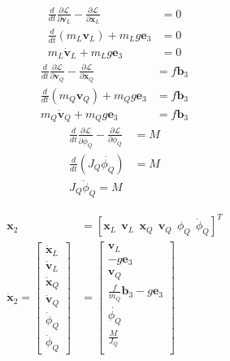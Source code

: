 \documentclass[11pt]{article}
\begin{document}
\begin{align*}
\frac{d}{dt} \frac{\partial \mathcal{L}}{\partial \mathbf{v}_L} - \frac{\partial \mathcal{L}}{\partial \mathbf{x}_L} &= 0 \\
\frac{d}{dt} \left( m_L \mathbf{v}_L \right) + m_L g \mathbf{e}_3 &= 0 \\
m_L \mathbf{\dot{v}}_L + m_L g \mathbf{e}_3 &= 0
\end{align*}
\begin{align*}
\frac{d}{dt} \frac{\partial \mathcal{L}}{\partial \mathbf{v}_Q} - \frac{\partial \mathcal{L}}{\partial \mathbf{x}_Q} &= f \mathbf{b}_3 \\
\frac{d}{dt} \left( m_Q \mathbf{v}_Q \right) + m_Q g \mathbf{e}_3 &= f \mathbf{b}_3 \\
m_Q \mathbf{\dot{v}}_Q + m_Q g \mathbf{e}_3 &= f \mathbf{b}_3
\end{align*}
\begin{align*}
\frac{d}{dt} \frac{\partial \mathcal{L}}{\partial \dot{\phi}_Q} - \frac{\partial \mathcal{L}}{\partial \phi_Q} &= M \\
\frac{d}{dt} \left( J_Q \dot{\phi_Q} \right) &= M \\
J_Q \ddot{\phi}_Q = M 
\end{align*}

\begin{align*}
\mathbf{x}_2 &= [\mathbf{x}_L \ \ \mathbf{v}_L \ \ \mathbf{x}_Q \ \ \mathbf{v}_Q \ \  \phi_Q \ \ \dot{\phi}_Q]^T \\
\dot{\mathbf{x}}_2 = 
\begin{bmatrix}
       \dot{\mathbf{x}}_L \\ \dot{\mathbf{v}}_L \\ \dot{\mathbf{x}}_Q \\ \dot{\mathbf{v}}_Q \\ \dot{\phi}_Q \\ \ddot{\phi}_Q
\end{bmatrix}
&= 
\begin{bmatrix}
       \mathbf{v}_L \\
       -g \mathbf{e}_3 \\
       \mathbf{v}_Q \\
       \frac{f}{m_Q} \mathbf{b}_3 - g \mathbf{e}_3  \\
       \dot{\phi_Q} \\
       \frac{M}{J_Q} \\
\end{bmatrix}
\end{align*}
\end{document}
